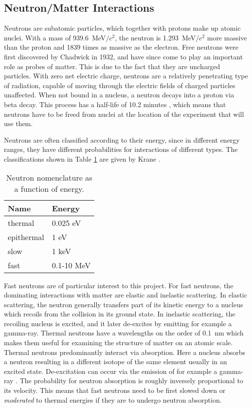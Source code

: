 \documentclass[main.tex]{subfiles}
\begin{document}
\subsection{Neutron/Matter Interactions}\label{sec:neutronMatterInteractions}
Neutrons are subatomic particles, which together with protons make up atomic nuclei. With a mass of \SI{939.6}{\MeV}$/c^\textrm{2}$, the neutron is \SI{1.293}{\MeV}$/c^\textrm{2}$ more massive than the proton and 1839 times as massive as the electron. 
Free neutrons were first discovered by Chadwick in 1932, and have since come to play an important role as probes of matter. This is due to the fact that they are uncharged particles. With zero net electric charge, neutrons are a relatively penetrating type of radiation, capable of moving through the electric fields of charged particles unaffected. When not bound in a nucleus, a neutron decays into a proton via beta decay. This process has a half-life of 10.2 minutes \cite{Nudat}, which means that neutrons have to be freed from nuclei at the location of the experiment that will use them.

Neutrons are often classified according to their energy, since in different energy ranges, they have different probabilities for interactions of different types. The classifications shown in Table \ref{tab:neutron} are given by Krane \cite{Krane}. 
\begin{table}[h]
\center
\begin{tabular}{|l|l|}
\hline
Name & Energy \\ \hline
thermal       & 0.025 eV        \\ \hline
epithermal    & 1 eV            \\ \hline
slow          & 1 keV           \\ \hline
fast          & 0.1-10 MeV      \\ \hline
\end{tabular}
\caption[Neutron nomenclature as a function of energy.]{Neutron nomenclature as a function of energy.}
\label{tab:neutron}
\end{table}
Fast neutrons are of particular interest to this project. For fast neutrons, the dominating interactions with matter are elastic and inelastic scattering. In elastic scattering, the neutron generally transfers part of its kinetic energy to a nucleus which recoils from the collision in its ground state. In inelastic scattering, the recoiling nucleus is excited, and it later de-excites by emitting for example a gamma-ray. Thermal neutrons have a wavelengths on the order of \SI{0.1}{nm} which makes them useful for examining the structure of matter on an atomic scale. 
Thermal neutrons predominantly interact via absorption. Here a nucleus absorbs a neutron resulting in a different isotope of the same element usually in an excited state. De-excitation can occur via the emission of for example a gamma-ray \cite{Leo}. The probability for neutron absorption is roughly inversely proportional to its velocity. This means that fast neutrons need to be first slowed down or \textit{moderated} to thermal energies if they are to undergo neutron absorption. 
\end{document}
